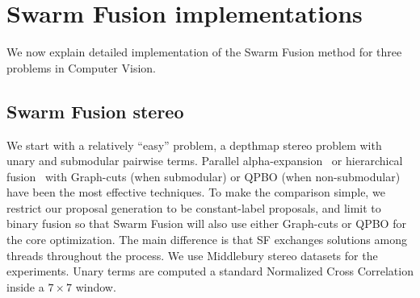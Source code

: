 \section{Swarm Fusion implementations}
We now explain detailed implementation of the Swarm Fusion method for
three problems in Computer Vision.

\subsection{Swarm Fusion stereo}
We start with a relatively ``easy'' problem, a depthmap stereo problem
with unary and submodular pairwise terms. Parallel
alpha-expansion~\cite{delong} or hierarchical fusion~\cite{delong,olga}
with Graph-cuts (when submodular) or QPBO (when non-submodular) have
been the most effective techniques.
%
To make the comparison simple, we restrict our proposal generation to be
constant-label proposals, and limit to binary fusion so that Swarm
Fusion will also use either Graph-cuts or QPBO for the core
optimization. The main difference is that SF exchanges solutions among
threads throughout the process.
%
We use Middlebury stereo datasets for the experiments. Unary terms are
computed a standard Normalized Cross Correlation inside a $7\times 7$
window.

